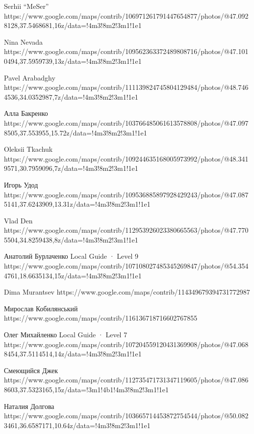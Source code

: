  
 
 
 
 

Serhii “MeSer”
https://www.google.com/maps/contrib/106971261791447654877/photos/@47.0928128,37.5468681,16z/data=!4m3!8m2!3m1!1e1

Nina Nevada
https://www.google.com/maps/contrib/109562363372489808716/photos/@47.1010494,37.5959739,13z/data=!4m3!8m2!3m1!1e1

Pavel Arabadghy
https://www.google.com/maps/contrib/111139824745804129484/photos/@48.7464536,34.0352987,7z/data=!4m3!8m2!3m1!1e1

Алла Бакренко
https://www.google.com/maps/contrib/103766485061613578808/photos/@47.0978505,37.553955,15.72z/data=!4m3!8m2!3m1!1e1

Oleksii Tkachuk
https://www.google.com/maps/contrib/109244635168005973992/photos/@48.3419571,30.7959096,7z/data=!4m3!8m2!3m1!1e1

Игорь Удод
https://www.google.com/maps/contrib/109536885897928429243/photos/@47.0875141,37.6243909,13.31z/data=!4m3!8m2!3m1!1e1

Vlad Den
https://www.google.com/maps/contrib/112953926023380665563/photos/@47.7705504,34.8259438,8z/data=!4m3!8m2!3m1!1e1

Анатолий Бурлаченко Local Guide · Level 9
https://www.google.com/maps/contrib/107108027485345269847/photos/@54.3544761,18.6635134,15z/data=!4m3!8m2!3m1!1e1

Dima Murantsev
https://www.google.com/maps/contrib/114349679394731772987

Мирослав Кобилянський
https://www.google.com/maps/contrib/116136718716602767855

Олег Михайленко Local Guide · Level 7
https://www.google.com/maps/contrib/107204559120431369908/photos/@47.0688454,37.5114514,14z/data=!4m3!8m2!3m1!1e1

Смеющийся Джек
https://www.google.com/maps/contrib/112735471731347119605/photos/@47.0868603,37.5323165,15z/data=!3m1!4b1!4m3!8m2!3m1!1e1

Наталия Долгова
https://www.google.com/maps/contrib/103665714453872754544/photos/@50.0823461,36.6587171,10.64z/data=!4m3!8m2!3m1!1e1


